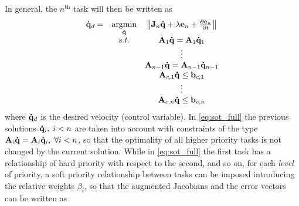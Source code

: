 In general, the  $n^{\text{th}}$ task will then be written as
\begin{equation}
\begin{array} {ccc}
    \mathbf{\dot{q}}_d  = & \underset{ \mathbf{\dot{q}} }{ \text{argmin} } & \left\| \mathbf{J}_n \mathbf{\dot{q}} + \lambda \mathbf{e}_n + \frac{\partial \mathbf{e}_n}{\partial t} \right\| \\
    & {s.t.} & \mathbf{A}_1 \mathbf{\dot{q}} = \mathbf{A}_1 \mathbf{\dot{q}}_1 \\
    & &  \vdots \\
    & & \mathbf{A}_{n-1} \mathbf{\dot{q}} = \mathbf{A}_{n-1} \mathbf{\dot{q}}_{n-1} \\
    & & \mathbf{A}_{c,1}\mathbf{\dot{q}} \leq \mathbf{b}_{c,1} \\
    & & \vdots \\
    & & \mathbf{A}_{c,n}\mathbf{\dot{q}} \leq \mathbf{b}_{c,n}
\end{array}
\label{eq:sot_full}
\end{equation}
where $\mathbf{\dot{q}}_d$ is the desired velocity (control variable).
In \eqref{eq:sot_full} the previous solutions $\mathbf{\dot{q}}_i, \; i < n$ are taken into account  with constraints of the type {$\mathbf{A}_i \mathbf{\dot{q}} = \mathbf{A}_i \mathbf{\dot{q}}_i, \; \forall i < n$},  so that the optimality of all higher priority tasks is not changed by the current solution.
While in \eqref{eq:sot_full} the first task has a relationship of hard priority with respect to the second, and so on, for each \emph{level}  of priority, a soft priority relationship between tasks can be imposed introducing the relative weights $\beta_i$, so that the augmented Jacobians and the error vectors can be written as
